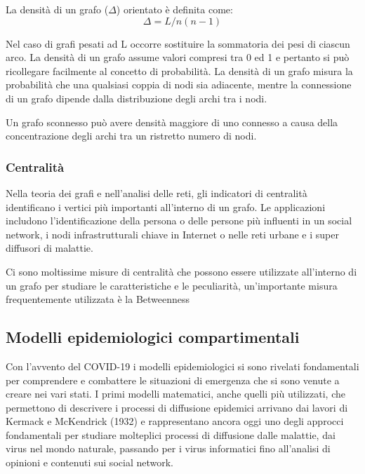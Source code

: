 La densità di un grafo ($\Delta$) orientato è definita come:
\begin{equation}
    \Delta = L/n(n-1)
\end{equation}

Nel caso di grafi pesati ad L occorre sostituire la sommatoria dei pesi di ciascun arco.
La densità di un grafo assume valori compresi tra 0 ed 1 e pertanto si può ricollegare facilmente al concetto di probabilità. La densità di un grafo misura la probabilità che una qualsiasi coppia di nodi sia adiacente, mentre la connessione di un grafo dipende dalla distribuzione degli archi tra i nodi.

Un grafo sconnesso può avere densità maggiore di uno connesso a causa della concentrazione degli archi tra un ristretto numero di nodi.

\subsubsection{Centralità}

Nella teoria dei grafi e nell'analisi delle reti, gli indicatori di centralità \cite{GrafoCentralita} identificano i vertici più importanti all'interno di un grafo. 
Le applicazioni includono l'identificazione della persona o delle persone più influenti in un social network, i nodi infrastrutturali chiave in Internet o nelle reti urbane e i super diffusori di malattie.

Ci sono moltissime misure di centralità che possono essere utilizzate all'interno di un grafo per studiare le caratteristiche e le peculiarità, un'importante misura frequentemente utilizzata è la Betweenness \cite{GrafoBetweenness}

\subsection{Modelli epidemiologici compartimentali}

Con l'avvento del COVID-19 i modelli epidemiologici si sono rivelati fondamentali per comprendere e combattere le situazioni di emergenza che si sono venute a creare nei vari stati.
I primi modelli matematici, anche quelli più utilizzati, che permettono di descrivere i processi di diffusione epidemici arrivano dai lavori di Kermack e McKendrick (1932) e rappresentano ancora oggi uno degli approcci fondamentali per studiare molteplici processi di diffusione dalle malattie, dai virus nel mondo naturale, passando per i virus informatici fino all'analisi di opinioni e contenuti sui social network.

